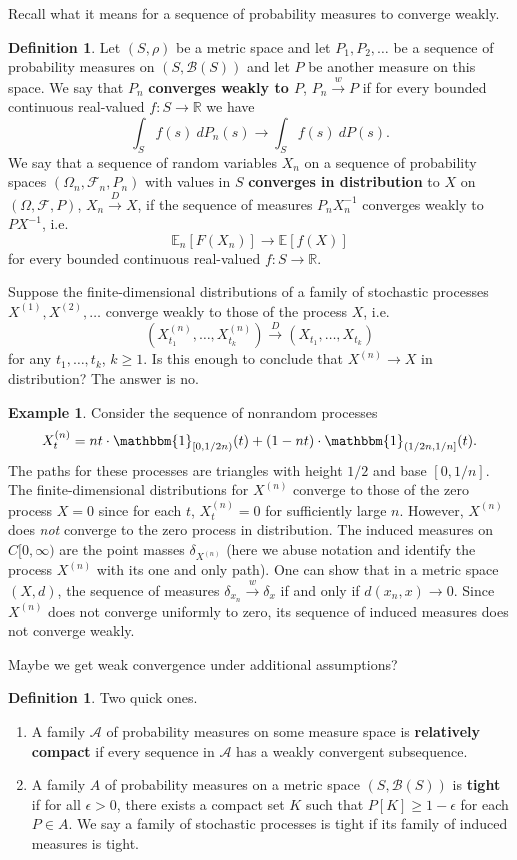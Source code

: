 \documentclass[11pt,letterpaper]{article}
\newcommand{\reals}{\mathbb{R}}
\newcommand{\mcal}[1]{\mathcal{#1}}
\newcommand{\E}{\mathbb{E}}
\newcommand{\ind}{\mathbbm{1}}
\newcommand{\weak}{\xrightarrow{w}}
\newcommand{\dist}{\xrightarrow{D}}
\theoremstyle{plain}
\theoremstyle{definition}
\newtheorem{definition}[theorem]{Definition} %
\newtheorem{example}[theorem]{Example} %
\begin{document}
\noindent Recall what it means for a sequence of probability measures to converge weakly.
\begin{definition}
	Let $(S, \rho)$ be a metric space and let $P_1, P_2, \ldots$ be a sequence of probability measures on $(S, \mcal{B}(S))$ and let $P$ be another measure on this space. We say that $P_n$ \textbf{converges weakly to $P$}, $P_n\weak P$ if for every bounded continuous real-valued $f: S\to \reals$ we have
	\[
	\int_S f(s)\ dP_n(s) \to \int_S f(s)\ dP(s).
	\]
	We say that a sequence of random variables $X_n$ on a sequence of probability spaces $(\Omega_n, \mcal{F}_n, P_n)$ with values in $S$ \textbf{converges in distribution} to $X$ on $(\Omega, \mcal{F}, P)$, $X_n\dist X$, if the sequence of measures $P_nX_n^{-1}$ converges weakly to $PX^{-1}$, i.e.
	\[
	\E_n[F(X_n)]\to \E[f(X)]
	\]
	for every bounded continuous real-valued $f: S\to \reals$.
\end{definition}

\noindent Suppose the finite-dimensional distributions of a family of stochastic processes $X^{(1)}, X^{(2)}, \ldots$ converge weakly to those of the process $X$, i.e.
\[
(X^{(n)}_{t_1}, \ldots, X^{(n)}_{t_k})\dist (X_{t_1}, \ldots, X_{t_k})
\]
for any $t_1, \ldots, t_k$, $k\geq 1$. Is this enough to conclude that $X^{(n)}\to X$ in distribution? The answer is no.

\begin{example}
	Consider the sequence of nonrandom processes
	\[
	X^{(n)}_t = nt\cdot \ind_{[0, 1/2n)}(t) + (1-nt)\cdot \ind_{(1/2n, 1/n]}(t).
	\]
	The paths for these processes are triangles with height $1/2$ and base $[0, 1/n]$. The finite-dimensional distributions for $X^{(n)}$ converge to those of the zero process $X = 0$ since for each $t$, $X^{(n)}_t = 0$ for sufficiently large $n$. However, $X^{(n)}$ does \textit{not} converge to the zero process in distribution. The induced measures on $C[0, \infty)$ are the point masses $\delta_{X^{(n)}}$ (here we abuse notation and identify the process $X^{(n)}$ with its one and only path). One can show that in a metric space $(X, d)$, the sequence of measures $\delta_{x_n}\weak \delta_x$ if and only if $d(x_n, x)\to 0$. Since $X^{(n)}$ does not converge uniformly to zero, its sequence of induced measures does not converge weakly.
\end{example}

\noindent Maybe we get weak convergence under additional assumptions?

\begin{definition}
	Two quick ones.
	\begin{enumerate}[(a.)]
		\item A family $\mcal{A}$ of probability measures on some measure space is \textbf{relatively compact} if every sequence in $\mcal{A}$ has a weakly convergent subsequence.
		\item A family $A$ of probability measures on a metric space $(S, \mcal{B}(S))$ is \textbf{tight} if for all $\epsilon>0$, there exists a compact set $K$ such that $P[K]\geq 1-\epsilon$ for each $P\in A$. We say a family of stochastic processes is tight if its family of induced measures is tight.
	\end{enumerate}
\end{definition}
\end{document}
